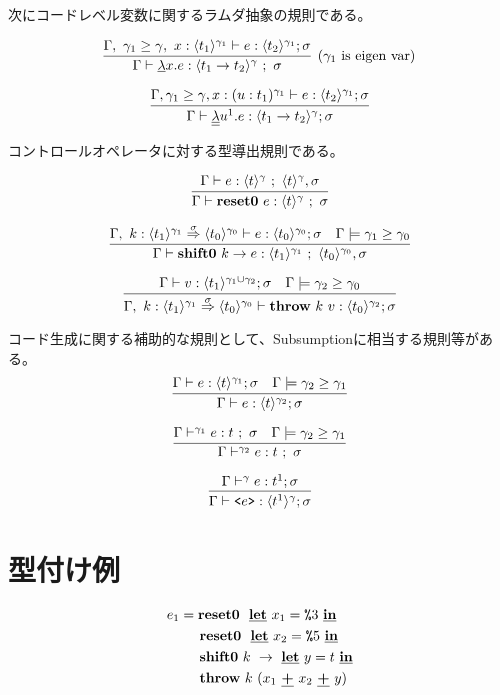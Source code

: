 次にコードレベル変数に関するラムダ抽象の規則である。

\[
  \infer[(\gamma_1~\text{is eigen var})]
  {\Gamma \vdash \cfun{x}{e} : \codeT{t_1\to t_2}{\gamma} ~;~ \sigma}
  {\Gamma,~\gamma_1 \ord \gamma,~x:\codeT{t_1}{\gamma_1} \vdash e
    : \codeT{t_2}{\gamma_1}; \sigma}
\]

\[
  \infer
  {\Gamma \vdash \ccfun{u^1}{e} : \codeT{t_1 \to t_2}{\gamma} ; \sigma}
  {\Gamma, \gamma_1 \ord \gamma, x : (u : t_1)^{\gamma_1} \vdash e : \codeT{t_2}{\gamma_1} ; \sigma}
\]

コントロールオペレータに対する型導出規則である。

\[
  \infer{\Gamma \vdash \resetz{e} : \codeT{t}{\gamma} ~;~ \sigma}
  {\Gamma \vdash e : \codeT{t}{\gamma} ~;~ \codeT{t}{\gamma}, \sigma}
\]

\[
  \infer{\Gamma \vdash \shiftz{k}{e} : \codeT{t_1}{\gamma_1} ~;~ \codeT{t_0}{\gamma_0},\sigma}
  {\Gamma,~k:\contT{\codeT{t_1}{\gamma_1}}{\codeT{t_0}{\gamma_0}}{\sigma}
    \vdash e : \codeT{t_0}{\gamma_0} ; \sigma
    & \Gamma \models \gamma_1 \ord \gamma_0
  }
\]

\[
  \infer
  {\Gamma,~k:\contT{\codeT{t_1}{\gamma_1}}{\codeT{t_0}{\gamma_0}}{\sigma}
    \vdash \throw{k}{v} : \codeT{t_0}{\gamma_2} ; \sigma}
  {\Gamma
    \vdash v : \codeT{t_1}{\gamma_1 \cup \gamma_2} ; \sigma
    & \Gamma \models \gamma_2 \ord \gamma_0
  }
\]

コード生成に関する補助的な規則として、Subsumptionに相当する規則等がある。
\[
  \infer
  {\Gamma \vdash e : \codeT{t}{\gamma_2} ; \sigma}
  {\Gamma \vdash e : \codeT{t}{\gamma_1} ; \sigma
    & \Gamma \models \gamma_2 \ord \gamma_1
  }
\]

\[
  \infer
  {\Gamma \vdash^{\gamma_2} e : t ~;~ \sigma}
  {\Gamma \vdash^{\gamma_1} e : t ~;~ \sigma
    & \Gamma \models \gamma_2 \ord \gamma_1
  }
\]


\[
  \infer
  {\Gamma \vdash \code{e} : \codeT{t^1}{\gamma} ; \sigma}
  {\Gamma \vdash^{\gamma} e : t^1 ; \sigma}
\]


\section{型付け例}

\begin{align*}
  e_1 & = \textbf{reset0} ~~\underline{\textbf{let}}~x_1=\texttt{\%}{3}~\underline{\textbf{in}} \\
      & \phantom{=}~~ \textbf{reset0} ~~\underline{\textbf{let}}~x_2=\texttt{\%}{5}~\underline{\textbf{in}} \\
      & \phantom{=}~~ \textbf{shift0}~k~\to~\underline{\textbf{let}}~y=t~\underline{\textbf{in}} \\
      & \phantom{=}~~ \textbf{throw}~k~(x_1~\underline{\textbf{+}}~x_2~\underline{\textbf{+}}~y)
\end{align*}

